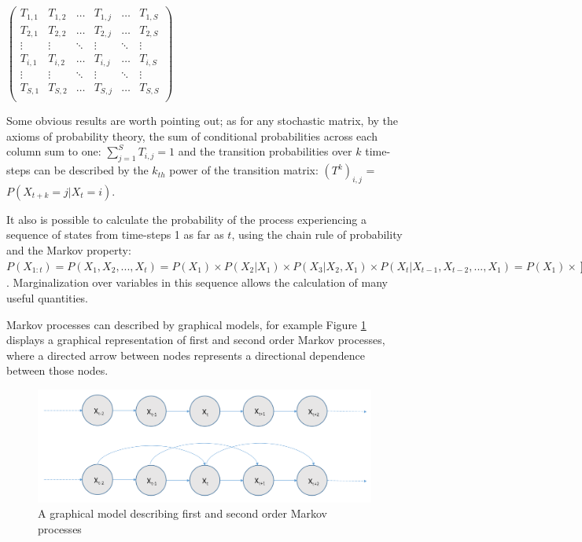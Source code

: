 \begin{center}
{$\displaystyle \left({\begin{matrix}T_{1,1}&T_{1,2}&\dots &T_{1,j}&\dots &T_{1,S}\\T_{2,1}&T_{2,2}&\dots &T_{2,j}&\dots &T_{2,S}\\\vdots &\vdots &\ddots &\vdots &\ddots &\vdots \\T_{i,1}&T_{i,2}&\dots &T_{i,j}&\dots &T_{i,S}\\\vdots &\vdots &\ddots &\vdots &\ddots &\vdots \\T_{S,1}&T_{S,2}&\dots &T_{S,j}&\dots &T_{S,S}\\\end{matrix}}\right)$}
\end{center}
\par

Some obvious results are worth pointing out; as for any stochastic matrix, by the axioms of probability theory, the sum of conditional probabilities across each column sum to one: {$\displaystyle \sum _{j=1}^{S}T_{i,j}=1$} and the transition probabilities over $k$ time-steps can be described by the $k_{th}$ power of the transition matrix: ${(T^k)}_{i,j}$ = $P(X_{t+k} = j | X_{t} = i)$. 

It also is possible to calculate the probability of the process experiencing a sequence of states from time-steps 1 as far as $t$, using the chain rule of probability and the Markov property:
$P(X_{1:t}) = P(X_1, X_2, ..., X_t) = P(X_1)\times P(X_2 | X_1)\times P(X_3 | X_2, X_1) \times P(X_t | X_{t-1}, X_{t-2}, ... , X_1) = P(X_1) \times \prod_{i=2}^{t}{P(X_i | x_{i-1})}$. Marginalization over variables in this sequence allows the calculation of many useful quantities.
\par

Markov processes can described by graphical models, for example Figure \ref{fig:markov-processes} displays a graphical representation of first and second order Markov processes, where a directed arrow between nodes represents a directional dependence between those nodes.

\begin{figure}[h]
    \centering
    \includegraphics[width=0.8\linewidth]{Chapters/BackgroundKnowledgeAndRelatedWork/MultiAgentTargetDetectionBackground/Figs/MarkovProcesses/MarkovProcesses.png}
    \caption{A graphical model describing first and second order Markov processes}
    \label{fig:markov-processes}
\end{figure}

